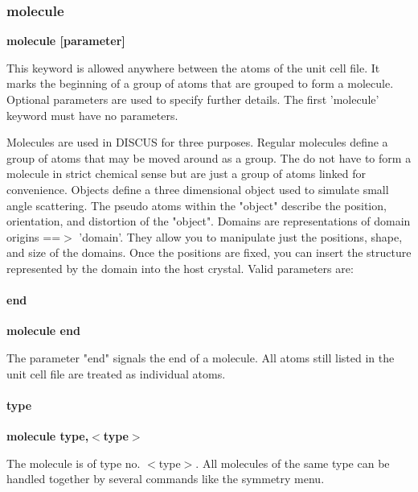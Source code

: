 \subsubsection{molecule}
{\bf molecule [parameter] \par }
\par
\vspace{3pt}
This keyword is allowed anywhere between the atoms of the unit cell file. 
It marks the beginning of a group of atoms that are grouped to form a 
molecule. 
Optional parameters are used to specify further details. The first 
'molecule' keyword must have no parameters. 
\par
Molecules are used in DISCUS for three purposes. 
Regular molecules define a group of atoms that may be moved around as 
        a group. The do not have to form a molecule in strict chemical 
        sense but are just a group of atoms linked for convenience. 
Objects define a three dimensional object used to simulate small angle 
        scattering. The pseudo atoms within the "object" describe the 
        position, orientation, and distortion of the "object". 
Domains are representations of domain origins ==$> $ 'domain'. They 
        allow you to manipulate just the positions, shape, and size of 
        the domains.  Once the positions are fixed, you can insert 
        the structure represented by the domain into the host 
        crystal. 
Valid parameters are: 
\par
\paragraph*{end}
{\bf molecule end \par }
\par
\vspace{3pt}
The parameter "end" signals the end of a molecule. All atoms still listed 
in the unit cell file are treated as individual atoms. 
\par
\paragraph*{type}
{\bf molecule type,$ <$type$> $ \par }
\par
\vspace{3pt}
The molecule is of type no. $ <$type$> $. All molecules of the same type 
can be handled together by several commands like the symmetry menu. 
\par
